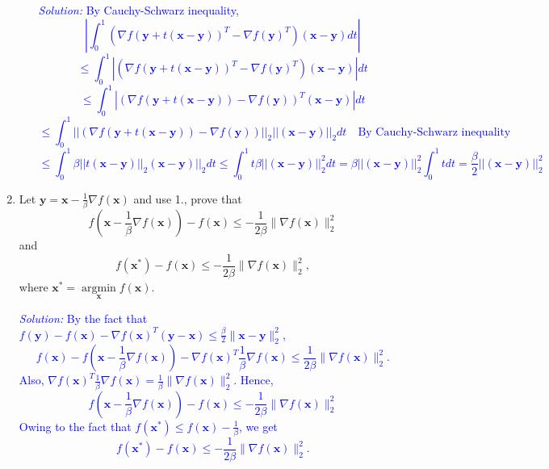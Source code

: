 \documentclass{article}
\def\solColor{blue}
\begin{document}
\begin{enumerate}
\begin{enumerate}
   \textcolor{\solColor}{\textit{Solution:}
By Cauchy-Schwarz inequality, $$| \int_0^1 (\nabla f(\boldsymbol{y}+t(\boldsymbol{x}-\boldsymbol{y}))^T - \nabla f(\boldsymbol{y})^T)(\boldsymbol{x}-\boldsymbol{y}) dt |$$
$$ \leq \int_0^1 | (\nabla f(\boldsymbol{y}+t(\boldsymbol{x}-\boldsymbol{y}))^T - \nabla f(\boldsymbol{y})^T)(\boldsymbol{x}-\boldsymbol{y}) |dt $$
$$ \leq \int_0^1 | (\nabla f(\boldsymbol{y}+t(\boldsymbol{x}-\boldsymbol{y})) - \nabla f(\boldsymbol{y}))^T(\boldsymbol{x}-\boldsymbol{y}) |dt $$
$$ \leq \int_0^1 ||(\nabla f(\boldsymbol{y}+t(\boldsymbol{x}-\boldsymbol{y})) - \nabla f(\boldsymbol{y}))||_2 ||(\boldsymbol{x}-\boldsymbol{y})||_2 dt \quad \text{By Cauchy-Schwarz inequality} $$
$$ \leq \int_0^1 \beta ||t(\boldsymbol{x}-\boldsymbol{y})||_2(\boldsymbol{x}-\boldsymbol{y})||_2 dt \leq \int_0^1 t \beta ||(\boldsymbol{x}-\boldsymbol{y})||_2^2 dt=\beta ||(\boldsymbol{x}-\boldsymbol{y})||_2^2\int_0^1 tdt = \frac{\beta}{2} ||(\boldsymbol{x}-\boldsymbol{y})||_2^2$$
}
 \end{enumerate}
 \item Let $\boldsymbol{y} = \boldsymbol{x} - \frac{1}{\beta} \nabla f(\boldsymbol{x})$ and use 1., prove that 
 $$f(\boldsymbol{x} - \frac{1}{\beta} \nabla f(\boldsymbol{x})) - f(\boldsymbol{x}) \leq -\frac{1}{2\beta} \lVert \nabla f(\boldsymbol{x}) \rVert_2^2$$
 and 
 $$f(\boldsymbol{x}^{*}) - f(\boldsymbol{x}) \leq -\frac{1}{2\beta} \lVert \nabla f(\boldsymbol{x}) \rVert_2^2,$$
 where $\boldsymbol{x}^{*} = \mathop{\arg\min}\limits_{\boldsymbol{x}} f(\boldsymbol{x})$.

   \textcolor{\solColor}{\textit{Solution:} 
By the fact that $f(\boldsymbol{y})-f(\boldsymbol{x})-\nabla f(\boldsymbol{x})^T (\boldsymbol{y}-\boldsymbol{x}) \leq \frac{\beta}{2} \lVert \boldsymbol{x}-\boldsymbol{y} \rVert_2^2$,
$$f(\boldsymbol{x}) - f(\boldsymbol{x} - \frac{1}{\beta} \nabla f(\boldsymbol{x})) - \nabla f(\boldsymbol{x})^T \frac{1}{\beta} \nabla f(\boldsymbol{x}) \leq \frac{1}{2\beta} \lVert \nabla f(\boldsymbol{x}) \rVert_2^2.$$ Also, $\nabla f(\boldsymbol{x})^T \frac{1}{\beta} \nabla f(\boldsymbol{x})=\frac{1}{\beta} \lVert \nabla f(\boldsymbol{x}) \rVert_2^2$. Hence, 
 $$f(\boldsymbol{x} - \frac{1}{\beta} \nabla f(\boldsymbol{x})) - f(\boldsymbol{x}) \leq -\frac{1}{2\beta} \lVert \nabla f(\boldsymbol{x}) \rVert_2^2$$
Owing to the fact that $f(\boldsymbol{x^*}) \leq f(\boldsymbol{x}) - \frac{1}{\beta}$, we get 
 $$f(\boldsymbol{x}^{*}) - f(\boldsymbol{x}) \leq -\frac{1}{2\beta} \lVert \nabla f(\boldsymbol{x}) \rVert_2^2.$$
}
 

\end{enumerate}
\end{document}
